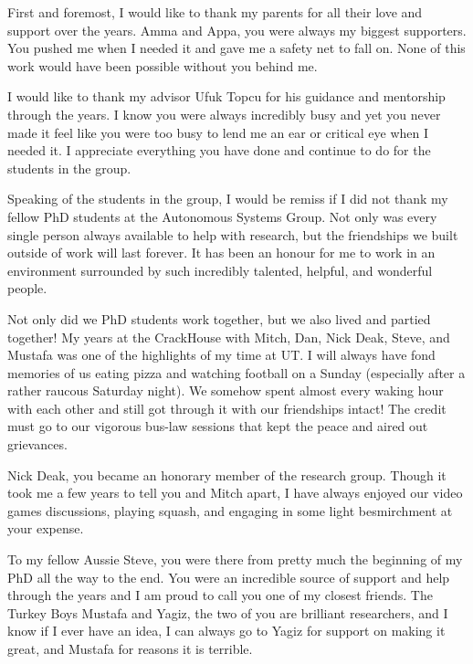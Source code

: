 \documentclass[12pt,twosided,openright]{report}	%
\theoremstyle{definition}
\theoremstyle{remark}
\begin{document}
\begin{acknowledgments}		%
%

First and foremost, I would like to thank my parents for all their love and support over the years. Amma and Appa, you were always my biggest supporters. You pushed me when I needed it and gave me a safety net to fall on. None of this work would have been possible without you behind me.  

I would like to thank my advisor Ufuk Topcu for his guidance and mentorship through the years. I know you were always incredibly busy and yet you never made it feel like you were too busy to lend me an ear or critical eye when I needed it. I appreciate everything you have done and continue to do for the students in the group. 

Speaking of the students in the group, I would be remiss if I did not thank my fellow PhD students at the Autonomous Systems Group. Not only was every single person always available to help with research, but the friendships we built outside of work will last forever. It has been an honour for me to work in an environment surrounded by such incredibly talented, helpful, and wonderful people. 


Not only did we PhD students work together, but we also lived and partied together! My years at the CrackHouse with Mitch, Dan, Nick Deak, Steve, and Mustafa was one of the highlights of my time at UT. I will always have fond memories of us eating pizza and watching football on a Sunday (especially after a rather raucous Saturday night). We somehow spent almost every waking hour with each other and still got through it with our friendships intact! The credit must go to our vigorous bus-law sessions that kept the peace and aired out grievances. 

Nick Deak, you became an honorary member of the research group. Though it took me a few years to tell you and Mitch apart, I have always enjoyed our video games discussions, playing squash, and engaging in some light besmirchment at your expense. 

To my fellow Aussie Steve, you were there from pretty much the beginning of my PhD all the way to the end. You were an incredible source of support and help through the years and I am proud to call you one of my closest friends. The Turkey Boys Mustafa and Yagiz, the two of you are brilliant researchers, and I know if I ever have an idea, I can always go to Yagiz for support on making it great, and Mustafa for reasons it is terrible. 


\end{acknowledgments}
\end{document}

